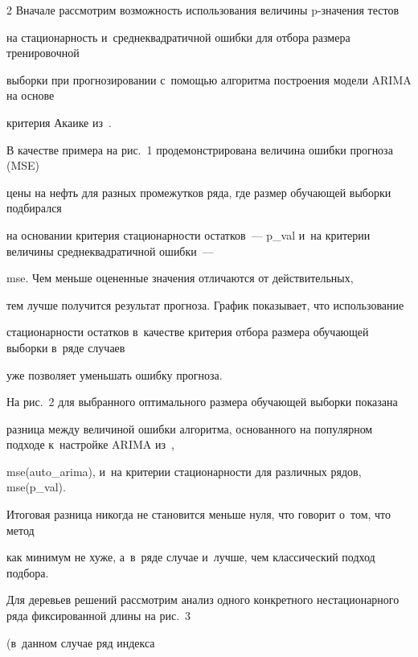 \begin{multicols}{2}
 Вначале рассмотрим возможность использования величины p-зна\-че\-ния тес\-тов 

 на стационарность и~среднеквадратичной ошибки для отбора размера тренировочной 

 выборки при прогнозировании с~по\-мощью алгоритма построения модели ARIMA на основе 

 критерия Акаике из~\cite{17-kr}.



В качестве примера на рис.~1 продемонстрирована величина ошибки прогноза (MSE) 

 цены на нефть для разных промежутков ряда, где размер обуча\-ющей выборки подбирался 

 на основании критерия стационарности остатков~--- p\_val и~на критерии величины среднеквадратичной ошибки~--- 

 mse.  Чем меньше оцененные значения отличаются от действительных, 

 тем лучше получится результат прогноза. График показывает, что использование 

 стационарности остатков в~качестве критерия отбора размера обуча\-ющей выборки в~ряде случаев 

 уже позволяет уменьшать ошибку прогноза.

 





На рис.~2 для выбранного оптимального размера обучающей выборки показана 

разница между величиной ошибки алгоритма, основанного на популярном подходе к~настройке ARIMA из~\cite{17-kr}, 

mse(auto\_arima),  и~на критерии стационарности для различных рядов, mse(p\_val). 

Итоговая разница никогда не становится меньше нуля, что говорит о~том, что  метод 

как минимум не хуже, а~в~ряде случае и~лучше, чем классический подход подбора.







Для деревьев решений рассмотрим анализ одного конкретного нестационарного ряда фиксированной длины на рис.~3 

(в~данном случае ряд индекса\linebreak\vspace*{-12pt}



\pagebreak



\end{multicols}





